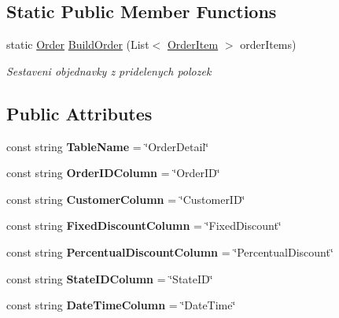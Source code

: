 \subsection*{Static Public Member Functions}
\begin{DoxyCompactItemize}
\item 
static \mbox{\hyperlink{class_eshop_1_1_order}{Order}} \mbox{\hyperlink{class_eshop_1_1_order_aa52c3d772414d3bd1387422bc2544268}{Build\+Order}} (List$<$ \mbox{\hyperlink{class_eshop_1_1_order_item}{Order\+Item}} $>$ order\+Items)
\begin{DoxyCompactList}\small\item\em Sestaveni objednavky z pridelenych polozek \end{DoxyCompactList}\end{DoxyCompactItemize}
\subsection*{Public Attributes}
\begin{DoxyCompactItemize}
\item 
\mbox{\label{class_eshop_1_1_order_a7c5a41df44ff672fba3a6e365fc20ba3}} 
const string {\bfseries Table\+Name} = \char`\"{}Order\+Detail\char`\"{}
\item 
\mbox{\label{class_eshop_1_1_order_a3bae31e634dfa819157b7dac0d94e840}} 
const string {\bfseries Order\+I\+D\+Column} = \char`\"{}Order\+ID\char`\"{}
\item 
\mbox{\label{class_eshop_1_1_order_aff0f043a6e3d13d67073eb1b366cd984}} 
const string {\bfseries Customer\+Column} = \char`\"{}Customer\+ID\char`\"{}
\item 
\mbox{\label{class_eshop_1_1_order_ae107d251b46d7395cb2ffcbc12ba621d}} 
const string {\bfseries Fixed\+Discount\+Column} = \char`\"{}Fixed\+Discount\char`\"{}
\item 
\mbox{\label{class_eshop_1_1_order_a1dec48de20e836ebedc7158abeb2ae80}} 
const string {\bfseries Percentual\+Discount\+Column} = \char`\"{}Percentual\+Discount\char`\"{}
\item 
\mbox{\label{class_eshop_1_1_order_a3268cb8ab42cbe07e303af04f0f70b13}} 
const string {\bfseries State\+I\+D\+Column} = \char`\"{}State\+ID\char`\"{}
\item 
\mbox{\label{class_eshop_1_1_order_a7d6eea038cef271d1d38a279c168bb77}} 
const string {\bfseries Date\+Time\+Column} = \char`\"{}Date\+Time\char`\"{}
\end{DoxyCompactItemize}
